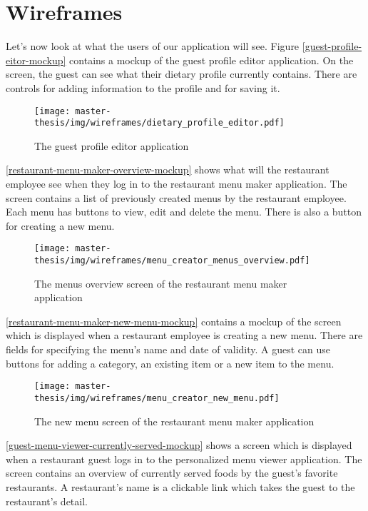 \section{Wireframes}
Let's now look at what the users of our application will see.
Figure \autoref{guest-profile-eitor-mockup} contains a mockup of the guest profile editor application.
On the screen, the guest can see what their dietary profile currently contains.
There are controls for adding information to the profile and for saving it.

\begin{figure}[h]
  \centering
  \texttt{[image: master-thesis/img/wireframes/dietary\_profile\_editor.pdf]}
  \caption{The guest profile editor application}\label{guest-profile-eitor-mockup}
\end{figure}

\autoref{restaurant-menu-maker-overview-mockup} shows what will the restaurant employee see when they log in to the restaurant menu maker application.
The screen contains a list of previously created menus by the restaurant employee.
Each menu has buttons to view, edit and delete the menu.
There is also a button for creating a new menu.

\begin{figure}[h]
  \centering
  \texttt{[image: master-thesis/img/wireframes/menu\_creator\_menus\_overview.pdf]}
  \caption{The menus overview screen of the restaurant menu maker application}\label{restaurant-menu-maker-overview-mockup}
\end{figure}

\autoref{restaurant-menu-maker-new-menu-mockup} contains a mockup of the screen which is displayed when a restaurant employee is creating a new menu.
There are fields for specifying the menu's name and date of validity.
A guest can use buttons for adding a category, an existing item or a new item to the menu.

\begin{figure}[h]
  \centering
  \texttt{[image: master-thesis/img/wireframes/menu\_creator\_new\_menu.pdf]}
  \caption{The new menu screen of the restaurant menu maker application}\label{restaurant-menu-maker-new-menu-mockup}
\end{figure}

\autoref{guest-menu-viewer-currently-served-mockup} shows a screen which is displayed when a restaurant guest logs in to the personalized menu viewer application.
The screen contains an overview of currently served foods by the guest's favorite restaurants.
A restaurant's name is a clickable link which takes the guest to the restaurant's detail.

